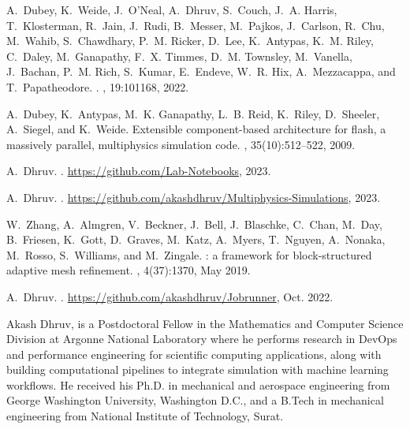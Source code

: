 \documentclass{IEEEcsmag}
\begin{document}
\begin{thebibliography}{1}

A.~Dubey, K.~Weide, J.~O’Neal, A.~Dhruv, S.~Couch, J.~A. Harris,
  T.~Klosterman, R.~Jain, J.~Rudi, B.~Messer, M.~Pajkos, J.~Carlson, R.~Chu,
  M.~Wahib, S.~Chawdhary, P.~M. Ricker, D.~Lee, K.~Antypas, K.~M. Riley,
  C.~Daley, M.~Ganapathy, F.~X. Timmes, D.~M. Townsley, M.~Vanella, J.~Bachan,
  P.~M. Rich, S.~Kumar, E.~Endeve, W.~R. Hix, A.~Mezzacappa, and
  T.~Papatheodore.
.
, 19:101168, 2022.

A.~Dubey, K.~Antypas, M.~K. Ganapathy, L.~B. Reid, K.~Riley, D.~Sheeler,
  A.~Siegel, and K.~Weide.
\newblock Extensible component-based architecture for flash, a massively
  parallel, multiphysics simulation code.
, 35(10):512--522, 2009.

A.~Dhruv.
.
\newblock \url{https://github.com/Lab-Notebooks}, 2023.

A.~Dhruv.
.
\newblock \url{https://github.com/akashdhruv/Multiphysics-Simulations}, 2023.

W.~Zhang, A.~Almgren, V.~Beckner, J.~Bell, J.~Blaschke, C.~Chan, M.~Day,
  B.~Friesen, K.~Gott, D.~Graves, M.~Katz, A.~Myers, T.~Nguyen, A.~Nonaka,
  M.~Rosso, S.~Williams, and M.~Zingale.
: a framework for block-structured adaptive mesh refinement.
, 4(37):1370, May 2019.


A.~Dhruv.
.
\newblock \url{https://github.com/akashdhruv/Jobrunner}, Oct. 2022.



\end{thebibliography}

%
%
%

\begin{IEEEbiography}{Akash Dhruv,} is a Postdoctoral Fellow in the Mathematics and Computer Science Division at Argonne National Laboratory where he performs research in DevOps and performance engineering for scientific computing applications, along with building computational pipelines to integrate simulation with machine learning workflows. He received his Ph.D. in mechanical and aerospace engineering from George Washington University, Washington D.C., and a B.Tech in mechanical engineering from National Institute of Technology, Surat. \vspace*{8pt}
\end{IEEEbiography}
\end{document}
